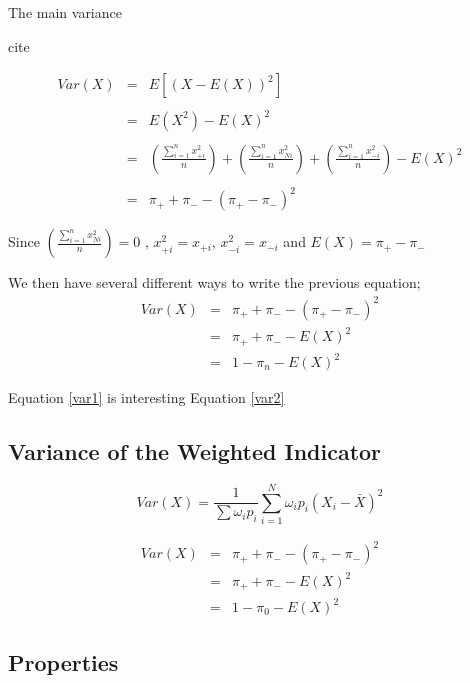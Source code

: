 \documentclass[12pt,a4paper,oneside]{book}
\begin{document}
The main variance

cite

\begin{eqnarray}
     Var(X) &=& E \left[ \left(X-E(X) \right)^2 \right] \nonumber \\ \nonumber \\
     &=& E\left( X^2\right) - E\left( X\right)^2 \nonumber \\ \nonumber \\
     &=& \left( \frac{\sum_{i=1}^n x_{+i}^2}{n} \right) + \left( \frac{\sum_{i=1}^n x_{Ni}^2}{n} \right) + \left( \frac{\sum_{i=1}^n x_{-i}^2}{n} \right) - E(X)^2  \nonumber \\ \nonumber \\
     &=& \pi_+ + \pi_- - ( \pi_+ - \pi_- )^2 
\end{eqnarray}

Since $\left( \frac{\sum_{i=1}^n x_{Ni}^2}{n} \right) = 0$ ,
$x_{+i}^2 = x_{+i}$, $x_{-i}^2 = x_{-i}$
and $E(X) = \pi_+ - \pi_-$


We then have several different ways to write the previous equation;
\begin{eqnarray}
Var(X) &=& \pi_+ + \pi_- - ( \pi_+ - \pi_- )^2 \label{var1} \\
	&=& \pi_+ + \pi_- - E ( X )^2 \label{var2} \\
	&=& 1 - \pi_n - E(X)^2 \label{var3}
\end{eqnarray}

Equation \ref{var1} is interesting 
Equation \ref{var2}






\subsection{Variance of the Weighted Indicator}

\begin{equation}
Var(X) = \frac{1}{\sum \omega_i p_i } \sum^N _{i=1} \omega_i p_i (X_i - \bar{X})^2
\end{equation}


\begin{eqnarray}
Var(X) &=& \pi_+ + \pi_- - ( \pi_+ - \pi_- )^2 \\
	&=& \pi_+ + \pi_- - E ( X )^2 \\
	&=& 1 - \pi_0 - E(X)^2
\end{eqnarray}


\subsection{Properties}
\end{document}
